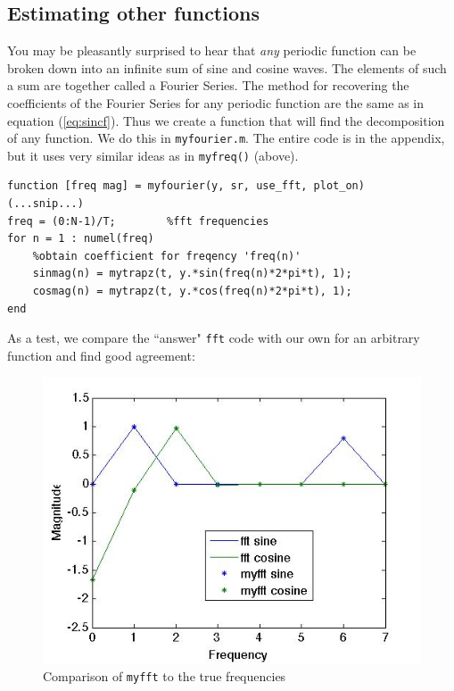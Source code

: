 \documentclass{article}
\begin{document}
\subsection{Estimating other functions}
You may be pleasantly surprised to hear that {\it any} periodic function can be broken down into an infinite sum of sine and cosine waves.  The elements of such a sum are together called a Fourier Series.  The method for recovering the coefficients of the Fourier Series for any periodic function are the same as in equation (\ref{eq:sincf}).  Thus we create a function that will find the decomposition of any function.  We do this in {\tt myfourier.m}.  The entire code is in the appendix, but it uses very similar ideas as in {\tt myfreq()} (above).

\begin{verbatim}
function [freq mag] = myfourier(y, sr, use_fft, plot_on)
(...snip...)
freq = (0:N-1)/T;        %fft frequencies
for n = 1 : numel(freq)
    %obtain coefficient for freqency 'freq(n)'
    sinmag(n) = mytrapz(t, y.*sin(freq(n)*2*pi*t), 1);
    cosmag(n) = mytrapz(t, y.*cos(freq(n)*2*pi*t), 1);
end

\end{verbatim}

As a test, we compare the ``answer" {\tt fft} code with our own for an arbitrary function and find good agreement:

\begin{figure}[htbp]
\begin{center}
\includegraphics[scale=0.7]{myfftcoef.png}
\caption{Comparison of {\tt myfft} to the true frequencies}
\label{fig:fftcoef}
\end{center}
\end{figure}
\end{document}
